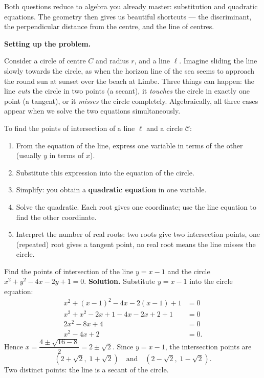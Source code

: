 \documentclass[11pt]{article}
\newcommand{\cle}[1]{{\popxbold\color{popdark}#1}}
\newcounter{popsec}
\newcounter{popsub}
\newcommand{\courssub}[1]{%
  \stepcounter{popsub}%
  \par\vspace{9pt}\noindent{\popxbold\fontsize{11.5}{13}\selectfont\color{popink}{\color{poporange}\thepopsec.\thepopsub}\hspace{6pt}#1}\par\nopagebreak\vspace{4pt}
}
\begin{document}
Both questions reduce to algebra you already master: substitution and quadratic equations. The geometry then gives us beautiful shortcuts — the discriminant, the perpendicular distance from the centre, and the line of centres.

\courssub{Intersection of a Line and a Circle}

\textbf{Setting up the problem.}\par
Consider a circle of centre $C$ and radius $r$, and a line $\ell$. Imagine sliding the line slowly towards the circle, as when the horizon line of the sea seems to approach the round sun at sunset over the beach at Limbe. Three things can happen: the line \emph{cuts} the circle in two points (a \cle{secant}), it \emph{touches} the circle in exactly one point (a \cle{tangent}), or it \emph{misses} the circle completely. Algebraically, all three cases appear when we solve the two equations simultaneously.

\begin{methode}
To find the points of intersection of a line $\ell$ and a circle $\mathscr{C}$:
\begin{enumerate}
\item From the equation of the line, express one variable in terms of the other (usually $y$ in terms of $x$).
\item Substitute this expression into the equation of the circle.
\item Simplify: you obtain a \textbf{quadratic equation} in one variable.
\item Solve the quadratic. Each root gives one coordinate; use the line equation to find the other coordinate.
\item Interpret the number of real roots: two roots give two intersection points, one (repeated) root gives a tangent point, no real root means the line misses the circle.
\end{enumerate}
\end{methode}

\begin{exoresolu}
Find the points of intersection of the line $y = x - 1$ and the circle $x^{2} + y^{2} - 4x - 2y + 1 = 0$.
\tcblower
\textbf{Solution.} Substitute $y = x - 1$ into the circle equation:
\begin{align*}
x^{2} + (x-1)^{2} - 4x - 2(x-1) + 1 &= 0\\
x^{2} + x^{2} - 2x + 1 - 4x - 2x + 2 + 1 &= 0\\
2x^{2} - 8x + 4 &= 0\\
x^{2} - 4x + 2 &= 0.
\end{align*}
Hence $x = \dfrac{4 \pm \sqrt{16 - 8}}{2} = 2 \pm \sqrt{2}$. Since $y = x - 1$, the intersection points are
\[ \left(2 + \sqrt{2},\; 1 + \sqrt{2}\right) \quad \text{and} \quad \left(2 - \sqrt{2},\; 1 - \sqrt{2}\right). \]
Two distinct points: the line is a secant of the circle.
\end{exoresolu}
\end{document}
